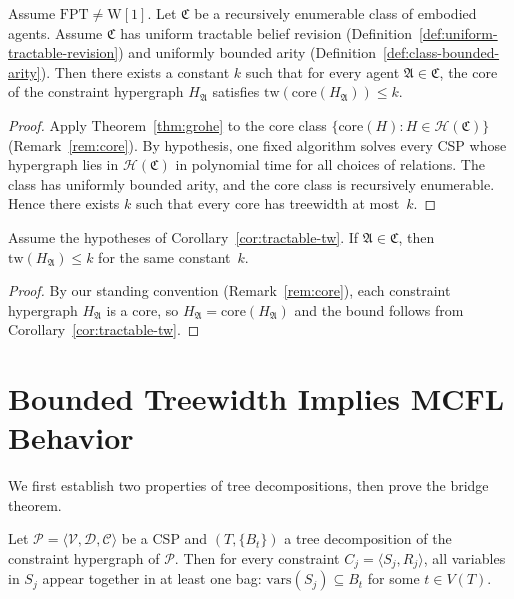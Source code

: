 \documentclass[runningheads]{llncs}
\begin{document}
\begin{corollary}\label{cor:tractable-tw}
Assume $\mathrm{FPT} \neq \mathrm{W}[1]$.
Let $\mathfrak{C}$ be a recursively enumerable class of embodied agents.
Assume $\mathfrak{C}$ has uniform tractable belief revision (Definition~\ref{def:uniform-tractable-revision}) and uniformly bounded arity (Definition~\ref{def:class-bounded-arity}).
Then there exists a constant $k$ such that for every agent $\mathfrak{A} \in \mathfrak{C}$, the core of the constraint hypergraph $H_{\mathfrak{A}}$ satisfies $\mathrm{tw}(\mathrm{core}(H_{\mathfrak{A}})) \leq k$.
\end{corollary}

\begin{proof}
Apply Theorem~\ref{thm:grohe} to the core class $\{\mathrm{core}(H) : H \in \mathcal{H}(\mathfrak{C})\}$ (Remark~\ref{rem:core}).
By hypothesis, one fixed algorithm solves every CSP whose hypergraph lies in $\mathcal{H}(\mathfrak{C})$ in polynomial time for all choices of relations.
The class has uniformly bounded arity, and the core class is recursively enumerable.
Hence there exists $k$ such that every core has treewidth at most~$k$.
\end{proof}

\begin{corollary}\label{cor:tractable-tw-instance}
Assume the hypotheses of Corollary~\ref{cor:tractable-tw}.
If $\mathfrak{A} \in \mathfrak{C}$, then $\mathrm{tw}(H_{\mathfrak{A}}) \leq k$ for the same constant~$k$.
\end{corollary}

\begin{proof}
By our standing convention (Remark~\ref{rem:core}), each constraint hypergraph $H_{\mathfrak{A}}$ is a core, so $H_{\mathfrak{A}} = \mathrm{core}(H_{\mathfrak{A}})$ and the bound follows from Corollary~\ref{cor:tractable-tw}.
\end{proof}

\section{Bounded Treewidth Implies MCFL Behavior}\label{sec:bridge}

We first establish two properties of tree decompositions, then prove the bridge theorem.

\begin{lemma}\label{lem:locality}
Let $\mathcal{P} = \langle \mathcal{V}, \mathcal{D}, \mathcal{C} \rangle$ be a CSP and $(T, \{B_t\})$ a tree decomposition of the constraint hypergraph of $\mathcal{P}$.
Then for every constraint $C_j = \langle S_j, R_j \rangle$, all variables in $S_j$ appear together in at least one bag: $\mathrm{vars}(S_j) \subseteq B_t$ for some $t \in V(T)$.
\end{lemma}
\end{document}
